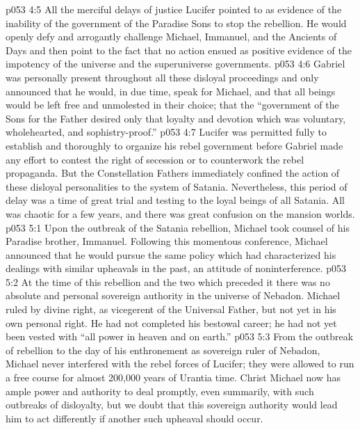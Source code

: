 \vs p053 4:5 \pc All the merciful delays of justice Lucifer pointed to as evidence of the inability of the government of the Paradise Sons to stop the rebellion. He would openly defy and arrogantly challenge Michael, Immanuel, and the Ancients of Days and then point to the fact that no action ensued as positive evidence of the impotency of the universe and the superuniverse governments.
\vs p053 4:6 Gabriel was personally present throughout all these disloyal proceedings and only announced that he would, in due time, speak for Michael, and that all beings would be left free and unmolested in their choice; that the “government of the Sons for the Father desired only that loyalty and devotion which was voluntary, wholehearted, and sophistry\hyp{}proof.”
\vs p053 4:7 \pc Lucifer was permitted fully to establish and thoroughly to organize his rebel government before Gabriel made any effort to contest the right of secession or to counterwork the rebel propaganda. But the Constellation Fathers immediately confined the action of these disloyal personalities to the system of Satania. Nevertheless, this period of delay was a time of great trial and testing to the loyal beings of all Satania. All was chaotic for a few years, and there was great confusion on the mansion worlds.
\vs p053 5:1 Upon the outbreak of the Satania rebellion, Michael took counsel of his Paradise brother, Immanuel. Following this momentous conference, Michael announced that he would pursue the same policy which had characterized his dealings with similar upheavals in the past, an attitude of noninterference.
\vs p053 5:2 \pc At the time of this rebellion and the two which preceded it there was no absolute and personal sovereign authority in the universe of Nebadon. Michael ruled by divine right, as vicegerent of the Universal Father, but not yet in his own personal right. He had not completed his bestowal career; he had not yet been vested with “all power in heaven and on earth.”
\vs p053 5:3 From the outbreak of rebellion to the day of his enthronement as sovereign ruler of Nebadon, Michael never interfered with the rebel forces of Lucifer; they were allowed to run a free course for almost 200,000 years of Urantia time. Christ Michael now has ample power and authority to deal promptly, even summarily, with such outbreaks of disloyalty, but we doubt that this sovereign authority would lead him to act differently if another such upheaval should occur.
